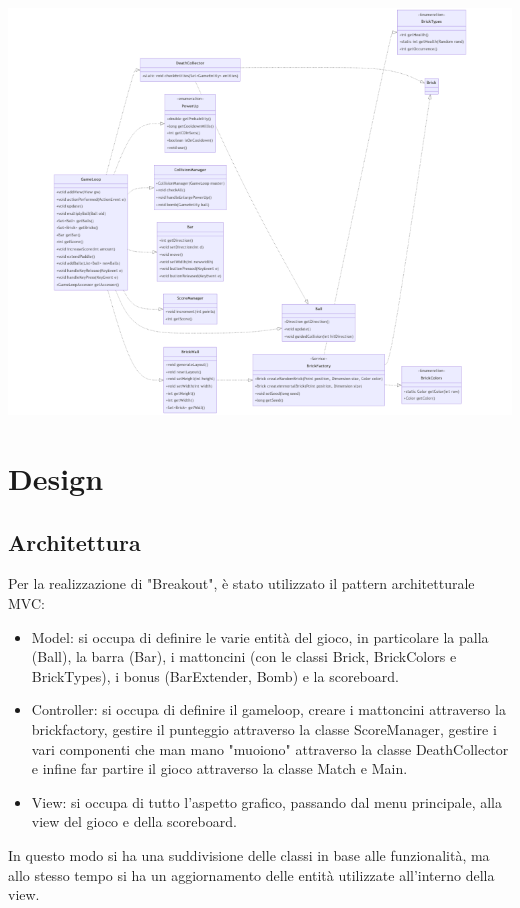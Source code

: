 \documentclass[a4paper,12pt]{report}
\begin{document}
\includegraphics[width=\textwidth]{total.png}


\chapter{Design}

\section{Architettura}
Per la realizzazione di "Breakout", è stato utilizzato il pattern architetturale MVC:
\begin{itemize}
    \item Model: si occupa di definire le varie entità del gioco, in particolare la palla (Ball), la barra (Bar), i mattoncini (con le classi Brick, BrickColors e BrickTypes), i bonus (BarExtender, Bomb) e la scoreboard.
    \item Controller: si occupa di definire il gameloop, creare i mattoncini attraverso la brickfactory, gestire il punteggio attraverso la classe ScoreManager, gestire i vari componenti che man mano "muoiono" attraverso la classe DeathCollector  e infine far partire il gioco attraverso la classe Match e Main.
    \item View: si occupa di tutto l'aspetto grafico, passando dal menu principale, alla view del gioco e della scoreboard.
\end{itemize}
In questo modo si ha una suddivisione delle classi in base alle funzionalità, ma allo stesso tempo si ha un aggiornamento delle entità utilizzate all'interno della view.
\end{document}
